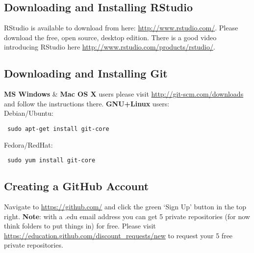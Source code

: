 \documentclass{article}[12pt]
\begin{document}
\subsection*{Downloading and Installing RStudio}
RStudio is available to download from here: \url{http://www.rstudio.com/}.
Please download the free, open source, desktop edition.
There is a good video introducing RStudio here \url{http://www.rstudio.com/products/rstudio/}.

\subsection*{Downloading and Installing Git}
\textbf{MS Windows} \& \textbf{Mac OS X} users please visit \url{http://git-scm.com/downloads} and follow the instructions there.\newline
\newline
\textbf{GNU+Linux} users:\\ 
Debian/Ubuntu: \begin{verbatim} sudo apt-get install git-core \end{verbatim}
Fedora/RedHat: \begin{verbatim} sudo yum install git-core \end{verbatim}

\subsection*{Creating a GitHub Account}
Navigate to \url{https://github.com/} and click the green `Sign Up' button in the top right.
\newline
\newline
\textbf{Note}: with a .edu email address you can get 5 private repositories (for now think folders to put things in) for free.
Please visit \url{https://education.github.com/discount_requests/new} to request your 5 free private repositories.
\clearpage
\end{document}
